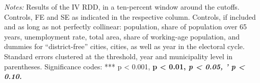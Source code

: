 \begin{table}[htbp]
   \par \raggedright 
   \footnotesize{\textit{Notes:} Results of the \ac{IV} \ac{RDD}, in a ten-percent window around the cutoffs. Controls, \ac{FE} and \ac{SE} as indicated in the respective column. Controls, if included and as long as not perfectly collinear: population, share of population over 65 years, unemployment rate, total area, share of working-age population, and dummies for ``district-free'' cities, cities, as well as year in the electoral cycle. Standard errors clustered at the threshold, year and municipality level in parentheses. Significance codes: *** p < 0.001, \textbf{ p < 0.01, \textit{ p < 0.05, ' p < 0.10.}}}
\end{table}



